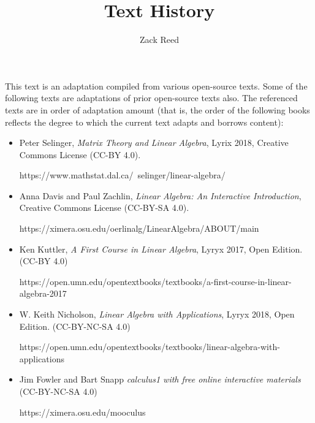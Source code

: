 \documentclass{ximera}
\author{Zack Reed}
\title{Text History}
\begin{document}
\begin{abstract}


\end{abstract}
\maketitle

This text is an adaptation compiled from various open-source texts. Some of the following texts are adaptations of prior open-source texts also. The referenced texts are in order of adaptation amount (that is, the order of the following books reflects the degree to which the current text adapts and borrows content):

\begin{itemize}

    \item Peter Selinger, {\it Matrix Theory and Linear Algebra}, Lyrix 2018, Creative Commons License (CC-BY 4.0).
    
    https://www.mathstat.dal.ca/~selinger/linear-algebra/
    
    \item Anna Davis and Paul Zachlin, {\it Linear Algebra: An Interactive Introduction}, Creative Commons License (CC-BY-SA 4.0).
    
    https://ximera.osu.edu/oerlinalg/LinearAlgebra/ABOUT/main

    \item Ken Kuttler, {\it A First Course in Linear Algebra}, Lyryx 2017, Open Edition. (CC-BY 4.0)
    
    https://open.umn.edu/opentextbooks/textbooks/a-first-course-in-linear-algebra-2017

    \item W. Keith Nicholson, {\it Linear Algebra with Applications}, Lyryx 2018, Open Edition. (CC-BY-NC-SA 4.0)
    
    https://open.umn.edu/opentextbooks/textbooks/linear-algebra-with-applications

    \item Jim Fowler and Bart Snapp {\it calculus1 with free online interactive materials} (CC-BY-NC-SA 4.0)

    https://ximera.osu.edu/mooculus

\end{itemize}
\end{document}
